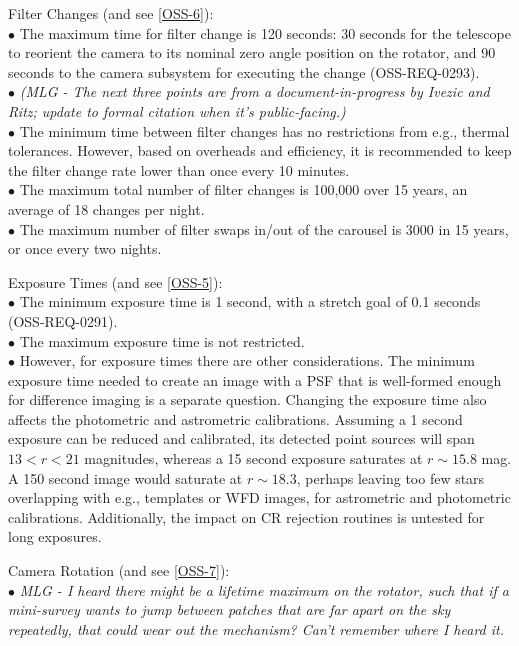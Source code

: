 \documentclass[DM,lsstdraft,toc]{lsstdoc}
\begin{document}
Filter Changes (and see \ref{OSS-6}): \\
$\bullet$ The maximum time for filter change is 120 seconds: 30 seconds for the telescope to reorient the camera to its nominal zero angle position on the rotator, and 90 seconds to the camera subsystem for executing the change (OSS-REQ-0293). \\
$\bullet$ \textit{(MLG - The next three points are from a document-in-progress by Ivezic and Ritz; update to formal citation when it's public-facing.)} \\
$\bullet$ The minimum time between filter changes has no restrictions from e.g., thermal tolerances. However, based on overheads and efficiency, it is recommended to keep the filter change rate lower than once every 10 minutes. \\
$\bullet$ The maximum total number of filter changes is 100,000 over 15 years, an average of 18 changes per night. \\
$\bullet$ The maximum number of filter swaps in/out of the carousel is 3000 in 15 years, or once every two nights.

Exposure Times (and see \ref{OSS-5}): \\
$\bullet$ The minimum exposure time is 1 second, with a stretch goal of 0.1 seconds (OSS-REQ-0291). \\
$\bullet$ The maximum exposure time is not restricted. \\
$\bullet$ However, for exposure times there are other considerations. The minimum exposure time needed to create an image with a PSF that is well-formed enough for difference imaging is a separate question. Changing the exposure time also affects the photometric and astrometric calibrations. Assuming a 1 second exposure can be reduced and calibrated, its detected point sources will span $13 < r < 21$ magnitudes, whereas a 15 second exposure saturates at $r\sim15.8$ mag. A 150 second image would saturate at $r\sim18.3$, perhaps leaving too few stars overlapping with e.g., templates or WFD images, for astrometric and photometric calibrations. Additionally, the impact on CR rejection routines is untested for long exposures. 

Camera Rotation (and see \ref{OSS-7}): \\
$\bullet$ \textit{MLG - I heard there might be a lifetime maximum on the rotator, such that if a mini-survey wants to jump between patches that are far apart on the sky repeatedly, that could wear out the mechanism? Can't remember where I heard it.}
\end{document}
